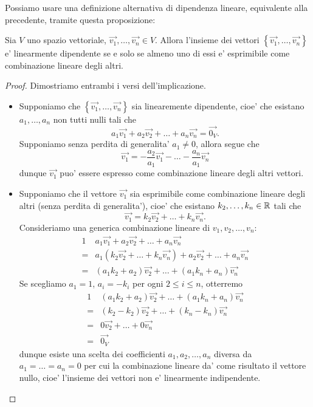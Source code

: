 Possiamo usare una definizione alternativa di dipendenza lineare, equivalente alla precedente, tramite questa proposizione:
\begin{proposition}\label{dip_se_e'_comb_lin}
    Sia $V$ uno spazio vettoriale, $\vec{v_1}, \dots, \vec{v_n} \in V$. Allora l'insieme dei vettori $\left\{ \vec{v_1}, \dots, \vec{v_n} \right\}$ e' linearmente dipendente se e solo se almeno uno di essi e' esprimibile come combinazione lineare degli altri. 
\end{proposition}
\begin{proof}
    Dimostriamo entrambi i versi dell'implicazione.
    \begin{itemize}
        \item Supponiamo che $\left\{ \vec{v_1}, \dots, \vec{v_n} \right\}$ sia linearemente dipendente, cioe' che esistano $a_1, \dots, a_n$ non tutti nulli tali che \[
            a_1\vec{v_1} + a_2\vec{v_2} + \dots + a_n\vec{v_n} = \vec{0_V}   
        .\]
        Supponiamo senza perdita di generalita' $a_1 \neq 0$, allora segue che \[
            \vec{v_1} = -\frac{a_2}{a_1}\vec{v_1} - \dots - \frac{a_n}{a_1}\vec{v_n}
        \]
        dunque $\vec{v_1}$ puo' essere espresso come combinazione lineare degli altri vettori.
        \item Supponiamo che il vettore $\vec{v_1}$ sia esprimibile come combinazione lineare degli altri (senza perdita di generalita'), cioe' che esistano $k_2, \dots, k_n \in \mathbb{R}$ tali che \[
            \vec{v_1} = k_2\vec{v_2} + \dots + k_n\vec{v_n}
        .\]
        Consideriamo una generica combinazione lineare di $v_1, v_2, \dots, v_n$:
        \begin{alignat*}
            {1}
            & a_1\vec{v_1} + a_2\vec{v_2} + \dots + a_n\vec{v_n} \\
            = & a_1(k_2\vec{v_2} + \dots + k_n\vec{v_n}) + a_2\vec{v_2} + \dots + a_n\vec{v_n} \\
            = & (a_1k_2 + a_2)\vec{v_2} + \dots + (a_1k_n + a_n)\vec{v_n}
        \end{alignat*}
        Se scegliamo $a_1 =1$, $a_i = -k_i$ per ogni $2 \leq i \leq n$, otterremo
        \begin{alignat*}{1}
            & (a_1k_2 + a_2)\vec{v_2} + \dots + (a_1k_n + a_n)\vec{v_n} \\
            = & (k_2 - k_2)\vec{v_2} + \dots + (k_n - k_n)\vec{v_n} \\
            = & 0\vec{v_2} + \dots + 0\vec{v_n} \\
            = & \vec{0_V}
        \end{alignat*}
        dunque esiste una scelta dei coefficienti $a_1, a_2, \dots, a_n$ diversa da $a_1 = \dots = a_n = 0$ per cui la combinazione lineare da' come risultato il vettore nullo, cioe' l'insieme dei vettori non e' linearmente indipendente. \qedhere
    \end{itemize}
\end{proof}

